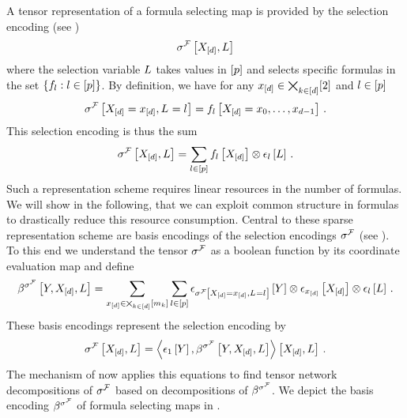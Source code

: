 A tensor representation of a formula selecting map is provided by the selection encoding (see )
\begin{align*}
    \sigma^{\mathcal{F}}\left[X_{[d]},L\right]
\end{align*}
where the selection variable $L$ takes values in $[p]$ and selects specific formulas in the set $\{f_{l} : l\in[p]\}$.
By definition, we have for any $x_{[d]}\in\bigtimes_{k\in[d]}[2]$ and $l\in[p]$
\begin{align*}
    \sigma^{\mathcal{F}}\left[X_{[d]}=x_{[d]},L_{}=l_{}\right]
    =  f_{l}\left[X_{[d]}={x_{0},\ldots,x_{d-1}}\right] \, .
\end{align*}
This selection encoding is thus the sum
\begin{align*}
    \sigma^{\mathcal{F}}\left[X_{[d]},L\right]
    = \sum_{l\in[p]} f_{l}\left[X_{[d]}\right]
    \otimes \epsilon_{l}\left[L\right] \, .
\end{align*}
Such a representation scheme requires linear resources in the number of formulas.
We will show in the following, that we can exploit common structure in formulas to drastically reduce this resource consumption.
Central to these sparse representation scheme are basis encodings of the selection encodings $\sigma^{\mathcal{F}}$ (see ).
To this end we understand the tensor $\sigma^{\mathcal{F}}$ as a boolean function by its coordinate evaluation map and define
\begin{align*}
    \beta^{\sigma^{\mathcal{F}}}\left[Y,X_{[d]},L\right]
    = \sum_{x_{[d]}\in\bigtimes_{k\in[d]}[m_{k}]}\sum_{l\in[p]} \epsilon_{\sigma^{\mathcal{F}}\left[X_{[d]}=x_{[d]},L_{}=l_{}\right]}\left[Y\right] \otimes \epsilon_{x_{[d]}}\left[X_{[d]}\right]  \otimes \epsilon_{l}\left[L\right] \, .
\end{align*}
These basis encodings represent the selection encoding by
\begin{align*}
    \sigma^{\mathcal{F}}\left[X_{[d]},L\right]
    = \left\langle \epsilon_{1}\left[Y\right],\beta^{\sigma^{\mathcal{F}}}\left[Y,X_{[d]},L\right]\right\rangle \left[ X_{[d]},L \right] \, .
\end{align*}
The mechanism of {\em \selectionSparsity{}} now applies this equations to find tensor network decompositions of $\sigma^{\mathcal{F}}$ based on decompositions of $\beta^{\sigma^{\mathcal{F}}}$.
We depict the basis encoding $\beta^{\sigma^{\mathcal{F}}}$ of formula selecting maps in .




